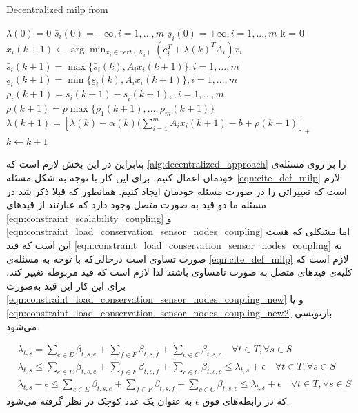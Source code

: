 \begin{latin}
	\begin{algorithm}
		\caption{Decentralized milp from \cite{decentralized_approach}} \label{alg:decentralized_approach}
		\begin{algorithmic}[1]
			\Procedure{}{}       %
				\State $\lambda(0) = 0$
				\State $\bar{s}_i(0) = -\infty , i = 1,...,m$ 
				\State $\underline{s}_i(0) = +\infty , i = 1,...,m$ 
				\State k = 0
				\Repeat
						\State $x_i(k+1) \gets \arg \displaystyle \min_{x_i \in vert(X_i)} (c_i^T + \lambda(k)^TA_i)x_i$
					\EndFor
					\State $\bar{s}_i(k+1) = \max\{\bar{s}_i(k), A_ix_i(k+1) \} , i = 1, \dots, m$
					\State $\underline{s}_i(k+1) = \min\{\underline{s}_i(k), A_ix_i(k+1) \} , i = 1,...,m$
					\State $\rho_i(k+1) = \bar{s}_i(k+1) - \underline{s}_i(k+1),  , i = 1,...,m$
					\State $\rho(k+1) = p \max \{ \rho_1(k+1), ..., \rho_m(k+1) \}$
					\State $\lambda(k+1) = [\lambda(k) + \alpha(k)(\sum_{i=1}^{m}A_ix_i(k+1)-b+\rho(k+1)]_+$
					\State $k \gets k+1$ 
			\EndProcedure
		\end{algorithmic}
	\end{algorithm}
\end{latin}
	بنابراین در این بخش لازم است که \cref{alg:decentralized_approach} را بر روی مسئله‌ی خودمان اعمال کنیم. برای این کار با توجه به شکل مسئله \cref{eqn:cite_def_milp} لازم است که تغییراتی را در صورت مسئله خودمان ایجاد کنیم. همانطور که قبلا ذکر شد در مسئله ما دو قید به صورت متصل وجود دارد که عبارتند از قیدهای \cref{eqn:constraint_scalability_coupling} و \cref{eqn:constraint_load_conservation_sensor_nodes_coupling} اما مشکلی که هست این است که قید \cref{eqn:constraint_load_conservation_sensor_nodes_coupling} به صورت تساوی است درحالی‌که با توجه به مسئله‌ی \cref{eqn:cite_def_milp} لازم است که کلیه‌ی قیدهای متصل به صورت نامساوی باشند لذا لازم است که قید مربوطه تغییر کند، برای این کار این قید به‌صورت \cref{eqn:constraint_load_conservation_sensor_nodes_coupling_new} و یا \cref{eqn:constraint_load_conservation_sensor_nodes_coupling_new2} بازنویسی می‌شود. 
	
	\begin{subequations}
		\begin{align}
			&\lambda_{t,s} = \sum_{e \in E} \beta_{t,s,e} + \sum_{f \in F} \beta_{t,s,f}
			+\sum_{c \in C}\beta_{t,s,c} \quad \forall{t \in T}, \forall{s \in S} \\
			&\lambda_{t,s} \le \sum_{e \in E} \beta_{t,s,e} + \sum_{f \in F} \beta_{t,s,f}
			+\sum_{c \in C}\beta_{t,s,c} \le \lambda_{t,s}+\epsilon \quad \forall{t \in T}, \forall{s \in S} \label{eqn:constraint_load_conservation_sensor_nodes_coupling_new} \\
			&\lambda_{t,s} - \epsilon \le \sum_{e \in E} \beta_{t,s,e} + \sum_{f \in F} \beta_{t,s,f}
			+\sum_{c \in C}\beta_{t,s,c} \le \lambda_{t,s}+\epsilon \quad \forall{t \in T}, \forall{s \in S}\label{eqn:constraint_load_conservation_sensor_nodes_coupling_new2}
		\end{align}
	\end{subequations}
	که در رابطه‌های فوق $\epsilon$ به عنوان یک عدد کوچک در نظر گرفته می‌شود. 

